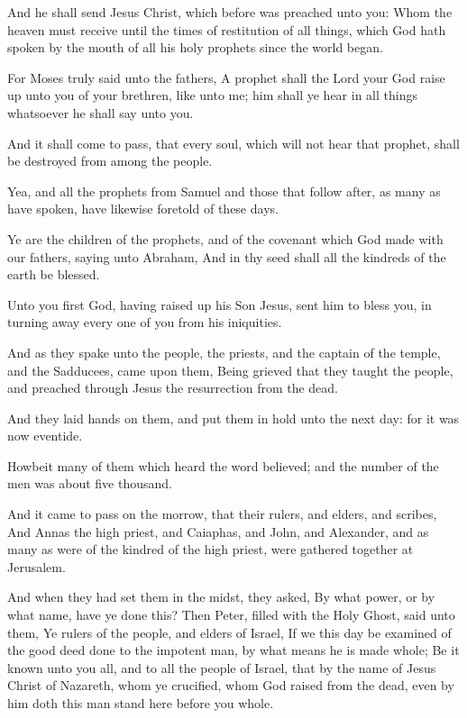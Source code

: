 \Verse And he shall send Jesus Christ, which before was preached unto you: \Verse Whom the heaven must receive until the times of restitution of all things, which God hath spoken by the mouth of all his holy prophets since the world began.

\Verse For Moses truly said unto the fathers, A prophet shall the Lord your God raise up unto you of your brethren, like unto me; him shall ye hear in all things whatsoever he shall say unto you.

\Verse And it shall come to pass, that every soul, which will not hear that prophet, shall be destroyed from among the people.

\Verse Yea, and all the prophets from Samuel and those that follow after, as many as have spoken, have likewise foretold of these days.

\Verse Ye are the children of the prophets, and of the covenant which God made with our fathers, saying unto Abraham, And in thy seed shall all the kindreds of the earth be blessed.

\Verse Unto you first God, having raised up his Son Jesus, sent him to bless you, in turning away every one of you from his iniquities.


\Chapter
\Verse And as they spake unto the people, the priests, and the captain of the temple, and the Sadducees, came upon them, \Verse Being grieved that they taught the people, and preached through Jesus the resurrection from the dead.

\Verse And they laid hands on them, and put them in hold unto the next day: for it was now eventide.

\Verse Howbeit many of them which heard the word believed; and the number of the men was about five thousand.

\Verse And it came to pass on the morrow, that their rulers, and elders, and scribes, \Verse And Annas the high priest, and Caiaphas, and John, and Alexander, and as many as were of the kindred of the high priest, were gathered together at Jerusalem.

\Verse And when they had set them in the midst, they asked, By what power, or by what name, have ye done this?  \Verse Then Peter, filled with the Holy Ghost, said unto them, Ye rulers of the people, and elders of Israel, \Verse If we this day be examined of the good deed done to the impotent man, by what means he is made whole; \Verse Be it known unto you all, and to all the people of Israel, that by the name of Jesus Christ of Nazareth, whom ye crucified, whom God raised from the dead, even by him doth this man stand here before you whole.

